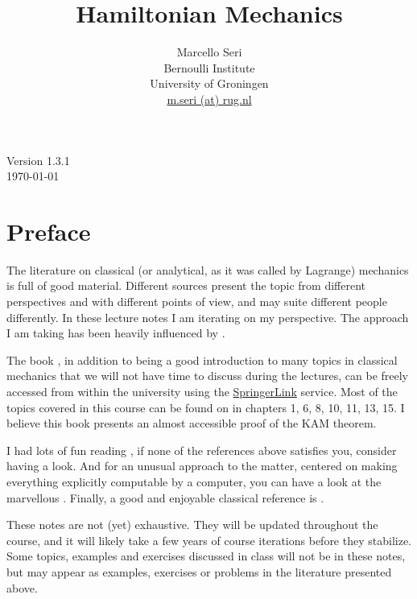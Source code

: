 \documentclass[english,fontsize=11pt,paper=a5,oneside]{scrbook}
\title{Hamiltonian Mechanics}
\author{Marcello Seri\\
\small{Bernoulli Institute}\vspace{-.2cm}\\
\small{University of Groningen}\vspace{-.2cm}\\
\small\href{mailto:m.seri@rug.nl}{m.seri (at) rug.nl}
}
\date{}
\theoremstyle{definition}
\def\biblio{}
\begin{document}
\def\biblio{}

\maketitle

\cleardoublepage

\thispagestyle{empty}
\null\vfill
\begin{center}
    Version 1.3.1\\
    \today
\end{center}
\vfill
\small{\doclicenseThis}

\cleardoublepage

\tableofcontents

\cleardoublepage

\chapter*{Preface}

The literature on classical (or analytical, as it was called by Lagrange) mechanics is full of good material.
Different sources present the topic from different perspectives and with different points of view, and may suite different people differently.
In these lecture notes I am iterating on my perspective.
The approach I am taking has been heavily influenced by \cite{book:arnold, book:knauf,lectures:dubrovin, book:lowenstein, book:marsdenratiu, lectures:tong,landau1976mechanics}.

The book \cite{book:knauf}, in addition to being a good introduction to many topics in classical mechanics that we will not have time to discuss during the lectures, can be freely accessed from within the university using the \href{https://link.springer.com/book/10.1007%2F978-3-662-55774-7}{SpringerLink} service.
Most of the topics covered in this course can be found on \cite{book:knauf} in chapters 1, 6, 8, 10, 11, 13, 15. I believe this book presents an almost accessible proof of the KAM theorem.

I had lots of fun reading \cite{schwichtenberg2019no}, if none of the references above satisfies you, consider having a look. And for an unusual approach to the matter, centered on making everything explicitly computable by a computer, you can have a look at the marvellous \cite{book:sicm}. Finally, a good and enjoyable classical reference is \cite{goldstein2013classical}.

These notes are not (yet) exhaustive.
They will be updated throughout the course, and it will likely take a few years of course iterations before they stabilize.
Some topics, examples and exercises discussed in class will not be in these notes, but may appear as examples, exercises or problems in the literature presented above.
\end{document}
